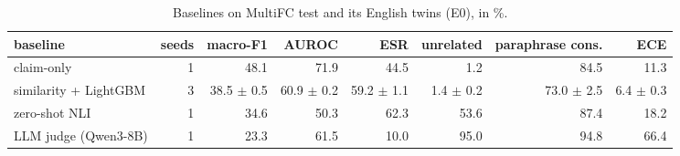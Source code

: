 \begin{table}[t]
\centering
\caption{Baselines on MultiFC test and its English twins (E0), in \%.}
\label{tab:tab_audit_E0}
\begin{tabular}{lrrrrrrr}
\toprule
baseline & seeds & macro-F1 & AUROC & ESR & unrelated & paraphrase cons. & ECE \\
\midrule
claim-only & 1 & 48.1 & 71.9 & 44.5 & 1.2 & 84.5 & 11.3 \\
similarity + LightGBM & 3 & 38.5 $\pm$ 0.5 & 60.9 $\pm$ 0.2 & 59.2 $\pm$ 1.1 & 1.4 $\pm$ 0.2 & 73.0 $\pm$ 2.5 & 6.4 $\pm$ 0.3 \\
zero-shot NLI & 1 & 34.6 & 50.3 & 62.3 & 53.6 & 87.4 & 18.2 \\
LLM judge (Qwen3-8B) & 1 & 23.3 & 61.5 & 10.0 & 95.0 & 94.8 & 66.4 \\
\bottomrule
\end{tabular}
\end{table}

